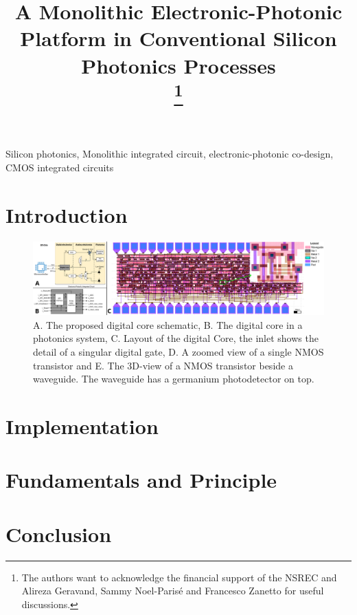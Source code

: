 \documentclass[conference]{IEEEtran}
\begin{document}
\title{A Monolithic Electronic-Photonic Platform in Conventional Silicon Photonics Processes\\
\thanks{The authors want to acknowledge the financial support of the NSREC and Alireza Geravand, Sammy Noel-Parisé and Francesco Zanetto for useful discussions.}
}
\author{
}

\newcommand{\CitationNeeded}{\textcolor{red}{\setlength{\fboxsep}{1pt}\colorbox{yellow}{[citation needed]}}}
\newcommand{\Value}{\textcolor{red}{\setlength{\fboxsep}{1pt}\colorbox{yellow}{[Missing Value]}}}
\newcommand{\MFig}{\textcolor{blue}{\setlength{\fboxsep}{1pt}\colorbox{green}{[Missing Figure]}}}

\maketitle

\begin{abstract}

\end{abstract}

\begin{IEEEkeywords}
Silicon photonics, Monolithic integrated circuit, electronic-photonic co-design, CMOS integrated circuits
\end{IEEEkeywords}

\section{Introduction}


\begin{figure}[t]
    \centering
    \includegraphics[width=\textwidth]{Core.png}
    \caption{A. The proposed digital core schematic, 
    B. The digital core in a photonics system,
    C. Layout of the digital Core, the inlet shows the detail of a singular digital gate,
    D. A zoomed view of a single NMOS transistor and
    E. The 3D-view of a NMOS transistor beside a waveguide. The waveguide has a germanium photodetector on top.   
    }
    \label{fig:Core}
    \vspace{-10pt}
\end{figure}

\section{Implementation}


\section{Fundamentals and Principle}




\section{Conclusion}



\end{document}

